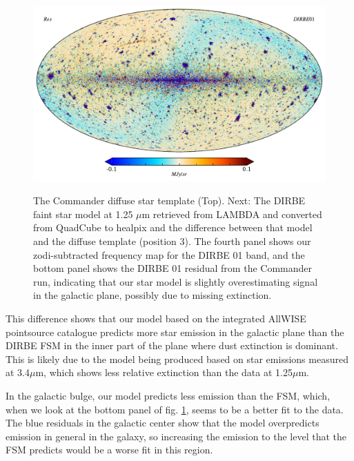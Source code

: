 \documentclass{aa}
\begin{document}
\begin{figure}
  \includegraphics[width=0.9\columnwidth]{figs/diffuseTemplate/band01_res.pdf}\\
  \caption{The Commander diffuse star template (Top). Next: The DIRBE faint star model at 1.25 $\mu$m retrieved from LAMBDA and converted from QuadCube to healpix and the difference between that model and the diffuse template (position 3). The fourth panel shows our zodi-subtracted frequency map for the DIRBE 01 band, and the bottom panel shows the DIRBE 01 residual from the Commander run, indicating that our star model is slightly overestimating signal in the galactic plane, possibly due to missing extinction.}
  \label{fig:DIRBEfaint}
\end{figure}

This difference shows that our model based on the integrated AllWISE pointsource catalogue predicts more star emission in the galactic plane than the DIRBE FSM in the inner part of the plane where dust extinction is dominant. This is likely due to the model being produced based on star emissions measured at 3.4$\mu$m, which shows less relative extinction than the data at 1.25$\mu$m. 

In the galactic bulge, our model predicts less emission than the FSM, which, when we look at the bottom panel of fig. \ref{fig:DIRBEfaint}, seems to be a better fit to the data. The blue residuals in the galactic center show that the model overpredicts emission in general in the galaxy, so  increasing the emission to the level that the FSM predicts would be a worse fit in this region. 
\end{document}
